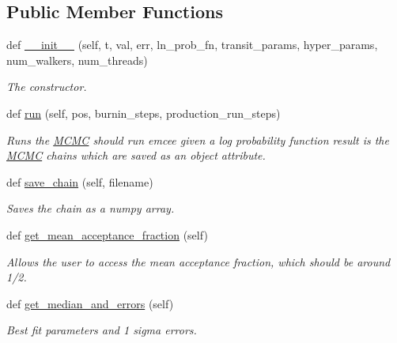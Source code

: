 \subsection*{Public Member Functions}
\begin{DoxyCompactItemize}
\item 
def \hyperlink{classexospec_1_1mcmc_1_1_m_c_m_c_aae17f42d9fa567e61df69f7c808aa931}{\+\_\+\+\_\+init\+\_\+\+\_\+} (self, t, val, err, ln\+\_\+prob\+\_\+fn, transit\+\_\+params, hyper\+\_\+params, num\+\_\+walkers, num\+\_\+threads)
\begin{DoxyCompactList}\small\item\em The constructor. \end{DoxyCompactList}\item 
def \hyperlink{classexospec_1_1mcmc_1_1_m_c_m_c_af103863b006ff9225432bdc8b2e90d81}{run} (self, pos, burnin\+\_\+steps, production\+\_\+run\+\_\+steps)
\begin{DoxyCompactList}\small\item\em Runs the \hyperlink{classexospec_1_1mcmc_1_1_m_c_m_c}{M\+C\+MC} should run emcee given a log probability function result is the \hyperlink{classexospec_1_1mcmc_1_1_m_c_m_c}{M\+C\+MC} chains which are saved as an object attribute. \end{DoxyCompactList}\item 
def \hyperlink{classexospec_1_1mcmc_1_1_m_c_m_c_ad20ecaec3fc481c3ab87ad7c4c0439bc}{save\+\_\+chain} (self, filename)
\begin{DoxyCompactList}\small\item\em Saves the chain as a numpy array. \end{DoxyCompactList}\item 
def \hyperlink{classexospec_1_1mcmc_1_1_m_c_m_c_afec10cdfb36657e6e1c013bbd563bd71}{get\+\_\+mean\+\_\+acceptance\+\_\+fraction} (self)
\begin{DoxyCompactList}\small\item\em Allows the user to access the mean acceptance fraction, which should be around 1/2. \end{DoxyCompactList}\item 
def \hyperlink{classexospec_1_1mcmc_1_1_m_c_m_c_a7fe8d9326590fe7cc875fa5118eaa617}{get\+\_\+median\+\_\+and\+\_\+errors} (self)
\begin{DoxyCompactList}\small\item\em Best fit parameters and 1 sigma errors. \end{DoxyCompactList}\item 

\end{DoxyCompactItemize}
